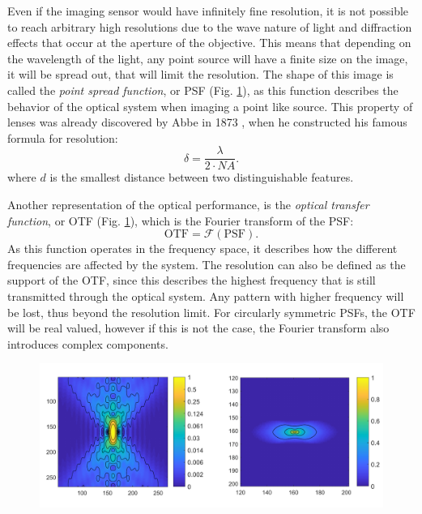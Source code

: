    Even if the imaging sensor would have infinitely fine resolution, it is not possible to reach arbitrary high resolutions due to the wave nature of light and diffraction effects that occur at the aperture of the objective. This means that depending on the wavelength of the light, any point source will have a finite size on the image, it will be spread out, that will limit the resolution. The shape of this image is called the \textit{point spread function}, or PSF (Fig. \ref{fig:psf-wf}), as this function describes the behavior of the optical system when imaging a point like source. This property of lenses was already discovered by Abbe in 1873 \cite{abbe_beitrage_1873}, when he constructed his famous formula for resolution:
    \begin{equation}
      \delta = \frac{\lambda}{2 \cdot NA}.
      \label{eq:abbe}
    \end{equation}
    where $d$ is the smallest distance between two distinguishable features.

    Another representation of the optical performance, is the \textit{optical transfer function}, or OTF (Fig. \ref{fig:psf-wf}), which is the Fourier transform of the PSF:
    \begin{equation}
      \text{OTF} = \mathcal{F}(\text{PSF}).
    \end{equation}
    As this function operates in the frequency space, it describes how the different frequencies are affected by the system. The resolution can also be defined as the support of the OTF, since this describes the highest frequency that is still transmitted through the optical system. Any pattern with higher frequency will be lost, thus beyond the resolution limit. For circularly symmetric PSFs, the OTF will be real valued, however if this is not the case, the Fourier transform also introduces complex components.

    \begin{figure}
      \centering
      \includegraphics[width=1\textwidth]{psfs/WF.pdf}
      \label{fig:psf-wf}
    \end{figure}


